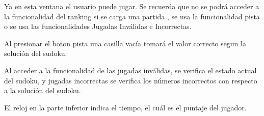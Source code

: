 Ya en esta ventana el usuario puede jugar. Se recuerda que no se podrá acceder a la funcionalidad del ranking si se carga una partida , se usa la funcionalidad pista o se usa las funcionalidades Jugadas Inválidas e Incorrectas.

Al presionar el boton pista una casilla vacía tomará el valor correcto segun la solución del sudoku.

Al acceder a la funcionalidad de las jugadas inválidas, se verifica el estado actual del sudoku, y jugadas incorrectas se verifica los números incorrectos con respecto a la solución del sudoku.

El reloj en la parte inferior indica el tiempo, el cuál es el puntaje del jugador.






